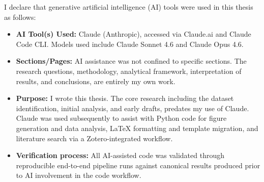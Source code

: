 \documentclass[12pt,oneside]{book}
\begin{document}
\newpage                                                                                         
\vspace*{\fill}                                                                                 
\begin{center}                                                                                   
\begin{doublespace}                                                                                   
I declare that generative artificial intelligence (AI) tools were used in this thesis as follows:
\begin{itemize} 

\item \textbf{AI Tool(s) Used:} Claude (Anthropic), accessed via Claude.ai and Claude Code CLI. Models used include Claude Sonnet 4.6 and Claude Opus 4.6.

\item \textbf{Sections/Pages:} AI assistance was not confined to specific sections. The research questions, methodology, analytical framework, interpretation of results, and conclusions, are entirely my own work. 

\item \textbf{Purpose:} I wrote this thesis. The core research including the dataset identification, initial analysis, and early drafts, predates my use of Claude. Claude was used subsequently to assist with Python code for figure generation and data analysis, \LaTeX{} formatting and template migration, and literature search via a Zotero-integrated workflow.

\item \textbf{Verification process:} All AI-assisted code was validated through reproducible end-to-end pipeline runs against canonical results produced prior to AI involvement in the code workflow.


\end{itemize}                 


\end{doublespace}                      
\end{center}
\vspace*{\fill}

\tableofcontents

\clearpage
{}
\begin{singlespace}
\listoftables
\end{singlespace}
\end{document}
